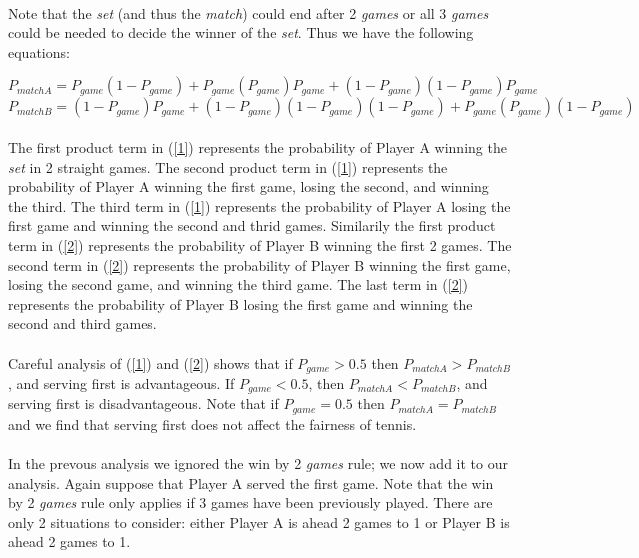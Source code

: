 \documentclass[12pt]{article}
\begin{document}
\paragraph{} Note that the \emph{set} (and thus the \emph{match}) could end after 2 \emph{games} or all 3 \emph{games} could be needed to decide the winner of the \emph{set}. Thus we have the following equations:

\begin{equation}
P_{matchA}=P_{game}(1-P_{game})+P_{game}(P_{game})P_{game}+(1-P_{game})(1-P_{game})P_{game}
\label{1}
\end{equation}
\begin{equation}
P_{matchB}=(1-P_{game})P_{game}+(1-P_{game})(1-P_{game})(1-P_{game})+P_{game}(P_{game})(1-P_{game})
\label{2}
\end{equation}

\paragraph{}The first product term in (\ref{1}) represents the probability of Player A winning the \emph{set} in 2 straight games. The second product term in (\ref{1}) represents the probability of Player A winning the first game, losing the second, and winning the third. The third term in (\ref{1}) represents the probability of Player A losing the first game and winning the second and thrid games. Similarily the first product term in (\ref{2}) represents the probability of Player B winning the first 2 games. The second term in (\ref{2}) represents the probability of Player B winning the first game, losing the second game, and winning the third game. The last term in (\ref{2}) represents the probability of Player B losing the first game and winning the second and third games.

\paragraph{} Careful analysis of (\ref{1}) and (\ref{2}) shows that if $P_{game}>0.5$ then $P_{matchA}>P_{matchB}$, and serving first is advantageous. If $P_{game}<0.5$, then $P_{matchA}<P_{matchB}$, and  serving first is disadvantageous. Note that if $P_{game}=0.5$ then $P_{matchA}=P_{matchB}$ and we find that serving first does not affect the fairness of tennis. 

\paragraph{} In the prevous analysis we ignored the win by 2 \emph{games} rule; we now add it to our analysis. Again suppose that Player A served the first game. Note that the win by 2 \emph{games} rule only applies if 3 games have been previously played. There are only 2 situations to consider: either Player A is ahead 2 games to 1 or Player B is ahead 2 games to 1.
\end{document}
